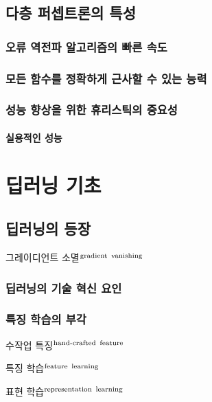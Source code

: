 \documentclass [12pt] {oblivoir}
\let\oldsubsubsection=\subsubsection
\renewcommand{\subsubsection}
{
  \filbreak
  \oldsubsubsection
}
\begin{document}
\subsection{다층 퍼셉트론의 특성}

\subsubsection{오류 역전파 알고리즘의 빠른 속도}

\subsubsection{모든 함수를 정확하게 근사할 수 있는 능력}

\subsubsection{성능 향상을 위한 휴리스틱의 중요성}

\paragraph*{실용적인 성능}\mbox{}

\vspace{3mm}

\newpage
\section{딥러닝 기초}

\subsection{딥러닝의 등장}

그레이디언트 소멸$^{\text{gradient\, vanishing}}$

\subsubsection{딥러닝의 기술 혁신 요인}

\subsubsection{특징 학습의 부각}

수작업 특징$^{\text{hand-crafted\, feature}}$

특징 학습$^{\text{feature\, learning}}$

표현 학습$^{\text{representation\, learning}}$
\end{document}
